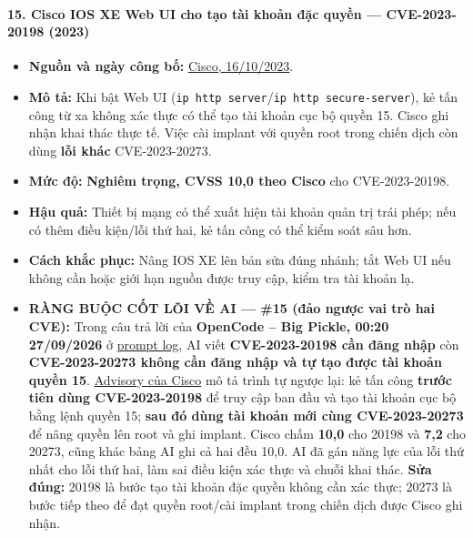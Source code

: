 \paragraph{15. Cisco IOS XE Web UI cho tạo tài khoản đặc quyền --- CVE-2023-20198 (2023)}\label{cisco-ios-xe-web-ui-cho-tux1ea1o-tuxe0i-khoux1ea3n-ux111ux1eb7c-quyux1ec1n-cve-2023-20198-2023}

\begin{itemize}
\tightlist
\item
  \textbf{Nguồn và ngày công bố:} \href{https://www.cisco.com/c/en/us/support/docs/csa/cisco-sa-iosxe-webui-privesc-j22SaA4z.html}{Cisco, 16/10/2023}.
\item
  \textbf{Mô tả:} Khi bật Web UI (\texttt{ip\ http\ server}/\texttt{ip\ http\ secure-server}), kẻ tấn công từ xa không xác thực có thể tạo tài khoản cục bộ quyền 15. Cisco ghi nhận khai thác thực tế. Việc cài implant với quyền root trong chiến dịch còn dùng \textbf{lỗi khác} CVE-2023-20273.
\item
  \textbf{Mức độ:} \textbf{Nghiêm trọng, CVSS 10,0 theo Cisco} cho CVE-2023-20198.
\item
  \textbf{Hậu quả:} Thiết bị mạng có thể xuất hiện tài khoản quản trị trái phép; nếu có thêm điều kiện/lỗi thứ hai, kẻ tấn công có thể kiểm soát sâu hơn.
\item
  \textbf{Cách khắc phục:} Nâng IOS XE lên bản sửa đúng nhánh; tắt Web UI nếu không cần hoặc giới hạn nguồn được truy cập, kiểm tra tài khoản lạ.
\item
  \textbf{RÀNG BUỘC CỐT LÕI VỀ AI --- \#15 (đảo ngược vai trò hai CVE):} Trong câu trả lời của \textbf{OpenCode -- Big Pickle, 00:20 27/09/2026} ở \href{Appendix_A_Prompt_Log.md}{prompt log}, AI viết \textbf{CVE-2023-20198 cần đăng nhập} còn \textbf{CVE-2023-20273 không cần đăng nhập và tự tạo được tài khoản quyền 15}. \href{https://www.cisco.com/c/en/us/support/docs/csa/cisco-sa-iosxe-webui-privesc-j22SaA4z.html}{Advisory của Cisco} mô tả trình tự ngược lại: kẻ tấn công \textbf{trước tiên dùng CVE-2023-20198} để truy cập ban đầu và tạo tài khoản cục bộ bằng lệnh quyền 15; \textbf{sau đó dùng tài khoản mới cùng CVE-2023-20273} để nâng quyền lên root và ghi implant. Cisco chấm \textbf{10,0} cho 20198 và \textbf{7,2} cho 20273, cũng khác bảng AI ghi cả hai đều 10,0. AI đã gán năng lực của lỗi thứ nhất cho lỗi thứ hai, làm sai điều kiện xác thực và chuỗi khai thác. \textbf{Sửa đúng:} 20198 là bước tạo tài khoản đặc quyền không cần xác thực; 20273 là bước tiếp theo để đạt quyền root/cài implant trong chiến dịch được Cisco ghi nhận.
\end{itemize}

